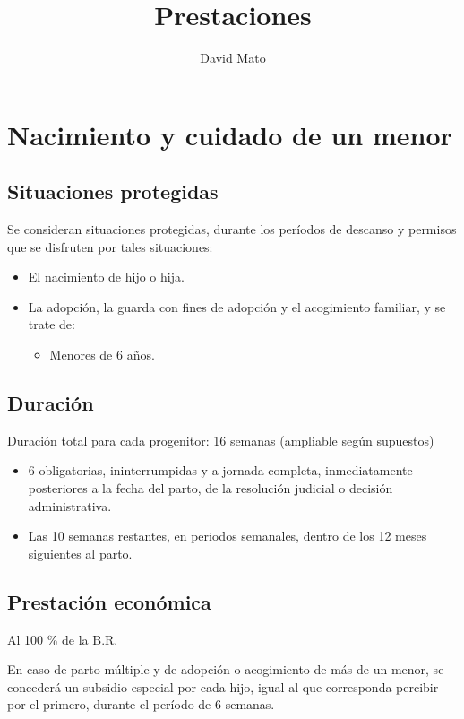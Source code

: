 \documentclass{article}
\title{Prestaciones}
\author{David Mato}
\date{} %
\begin{document}
	
	\maketitle %
	
	\section*{Nacimiento y cuidado de un menor}
	
	\subsection*{Situaciones protegidas}
	
	Se consideran situaciones protegidas, durante los períodos de descanso y permisos que se disfruten por tales situaciones:
	
	\begin{itemize}
		\item El nacimiento de hijo o hija.
		\item La adopción, la guarda con fines de adopción y el acogimiento familiar, y se trate de:
		\begin{itemize}
			\item Menores de 6 años.
		\end{itemize}
	\end{itemize}
	
	\subsection*{Duración}
	
	Duración total para cada progenitor: 16 semanas (ampliable según supuestos)
	
	\begin{itemize}
		\item 6 obligatorias, ininterrumpidas y a jornada completa, inmediatamente posteriores a la fecha del parto, de la resolución judicial o decisión administrativa.
		\item Las 10 semanas restantes, en periodos semanales, dentro de los 12 meses siguientes al parto.
	\end{itemize}
	
	\subsection*{Prestación económica}
	
	Al 100 \% de la B.R.
	
	En caso de parto múltiple y de adopción o acogimiento de más de un menor, se concederá un subsidio especial por cada hijo, igual al que corresponda percibir por el primero, durante el período de 6 semanas.
	
\end{document}
